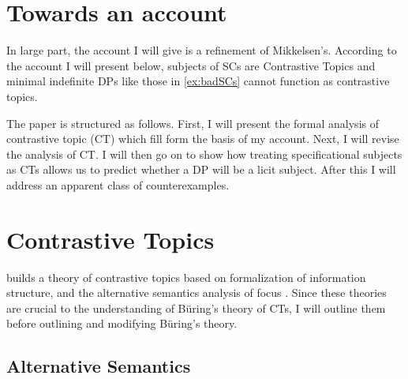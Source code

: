 \documentclass[letterpaper]{article}
\begin{document}
\section{Towards an account}
In large part, the account I will give is a refinement of Mikkelsen's.
According to the account I will present below, subjects of SCs are Contrastive Topics \parencite[in the sense of][]{buring2003d} and minimal indefinite DPs like those in \ref{ex:badSCs} cannot function as contrastive topics.

The paper is structured as follows.
First, I will present the formal analysis of contrastive topic (CT) which fill form the basis of my account.
Next, I will revise the analysis of CT.
I will then go on to show how treating specificational subjects as CTs allows us to predict whether a DP will be a licit subject.
After this I will address an apparent class of counterexamples.

\section{Contrastive Topics}
\textcite{buring2003d} builds a theory of contrastive topics based on  formalization of information structure, and the alternative semantics analysis of focus \parencite{rooth1992theory}.
Since these theories are crucial to the understanding of B\"uring's theory of CTs, I will outline them before outlining and modifying B\"uring's theory.

\subsection{Alternative Semantics}

\printbibliography
\end{document}
